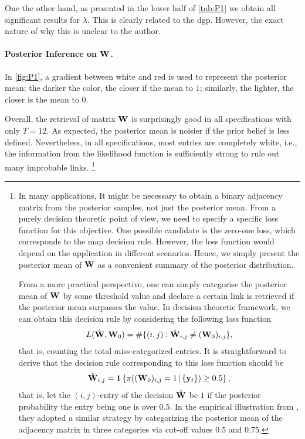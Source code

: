 \documentclass[a4paper]{article}
\begin{document}
One the other hand,
as presented in the lower half of \autoref{tab:P1}
we obtain all significant results for $\lambda$.
This is clearly related to the \gls{dgp}.
However, the exact nature of why this is unclear to the author.

\paragraph{Posterior Inference on $\mathbf{W}$.}

In \autoref{fig:P1},
a gradient between white and red is used to represent the posterior mean:
the darker the color, the closer if the mean to $1$;
similarly, the lighter, the closer is the mean to $0$.

Overall, the retrieval of matrix $\mathbf{W}$ is surprisingly good in all specifications with only $T=12$.
As expected,
the posterior mean is noisier if the prior belief is less defined.
Nevertheless, in all specifications,
most entries are completely white, i.e.,
the information from the likelihood function
is sufficiently strong to rule out many improbable links.
\footnote{
	In many applications,
	It might be necessary to obtain a binary adjacency matrix from the posterior samples,
	not just the posterior mean.
	From a purely decision theoretic point of view,
	we need to specify a specific loss function for this objective.
	One possible candidate is the zero-one loss,
	which corresponds to the \gls{map} decision rule.
	However, the loss function would depend on the application in different scenarios.
	Hence, we simply present the posterior mean of $\mathbf{W}$ as a convenient summary of the posterior distribution.

	From a more practical perspective,
	one can simply categorise the posterior mean of $\mathbf{W}$ by some threshold value
	and declare a certain link is retrieved if the posterior mean surpasses the value.
	In decision theoretic framework,
	we can obtain this decision rule by considering the following loss function
	\begin{align*}
		L(\hat{\mathbf{W}},\mathbf{W}_0) = \#\{(i,j):\hat{\mathbf{W}}_{i,j}\neq(\mathbf{W}_{0})_{i,j}\},
	\end{align*}
	that is, counting the total miss-categorized entries.
	It is straightforward to derive that the decision rule corresponding to this loss function should be
	\begin{align*}
		\hat{\mathbf{W}}_{i,j} = \boldsymbol{1}
		\left\{
		\pi((\mathbf{W}_0)_{i,j}=1\,|\,\{\mathbf{y}_{t}\}) \geq 0.5
		\right\},
	\end{align*}
	that is, let the $(i,j)$-entry of the decision $\hat{\mathbf{W}}$ be $1$ if the posterior probability the entry being one is over $0.5$.
	In the empirical illustration from \cite{krisztin-piribauer-2022},
	they adopted a similar strategy by categorizing the posterior mean of the adjacency matrix in three categories
	via cut-off values $0.5$ and $0.75$.
}
\end{document}
